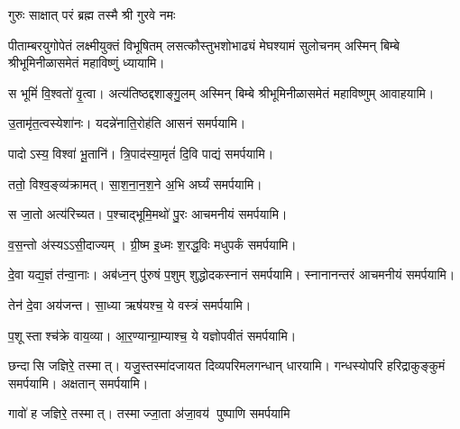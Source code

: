 {गुरुः साक्षात् परं ब्रह्म तस्मै श्री गुरवे नमः}

\centering

{पीताम्बरयुगोपेतं लक्ष्मीयुक्तं विभूषितम्}
{लसत्कौस्तुभशोभाढ्यं मेघश्यामं सुलोचनम्}
अस्मिन् बिम्बे श्रीभूमिनीळासमेतं महाविष्णुं ध्यायामि।
\medskip

{स भूमिं॑ वि॒श्वतो॑ वृ॒त्वा। अत्य॑तिष्ठद्दशाङ्गु॒लम्}
अस्मिन् बिम्बे श्रीभूमिनीळासमेतं महाविष्णुम् आवाहयामि।
\medskip

 {उ॒तामृ॑त॒त्वस्येशा॑नः। यदन्ने॑नाति॒रोह॑ति}
 आसनं समर्पयामि।\medskip

{पादोऽस्य॒ विश्वा॑ भू॒तानि॑। त्रि॒पाद॑स्या॒मृतं॑ दि॒वि}
 पाद्यं समर्पयामि।\medskip
 
{ततो॒ विश्व॒ङ्व्य॑क्रामत्। सा॒श॒ना॒न॒श॒ने अ॒भि}
 अर्घ्यं समर्पयामि।\medskip

{स जा॒तो अत्य॑रिच्यत। प॒श्चाद्भूमि॒मथो॑ पु॒रः}
 आचमनीयं समर्पयामि।\medskip

{व॒स॒न्तो अ॑स्यऽऽसी॒दाज्यम्। ग्री॒ष्म इ॒ध्मः श॒रद्ध॒विः}
मधुपर्कं समर्पयामि।\medskip

 {दे॒वा यद्य॒ज्ञं त॑न्वा॒नाः। अब॑ध्न॒न् पु॑रुषं प॒शुम्}
 शुद्धोदकस्नानं समर्पयामि। स्नानानन्तरं आचमनीयं समर्पयामि।\medskip

 {तेन॑ दे॒वा अय॑जन्त। सा॒ध्या ऋष॑यश्च॒ ये}
 वस्त्रं समर्पयामि।\medskip

{प॒शूस्ताश्च॑क्रे वाय॒व्या\sn{}। आ॒र॒ण्यान्ग्रा॒म्याश्च॒ ये}
 यज्ञोपवीतं समर्पयामि।\medskip

{छन्दासि जज्ञिरे॒ तस्मात्। यजु॒स्तस्मा॑दजायत}
 दिव्यपरिमलगन्धान् धारयामि। गन्धस्योपरि हरिद्राकुङ्कुमं समर्पयामि। अक्षतान् समर्पयामि।\medskip

{गावो॑ ह जज्ञिरे॒ तस्मात्। तस्माज्जा॒ता अ॑जा॒वय॑}
 पुष्पाणि समर्पयामि

